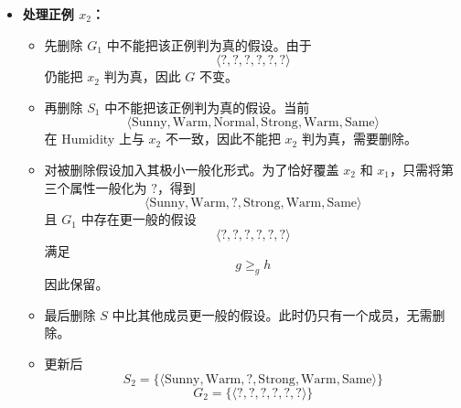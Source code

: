 \documentclass[../main.tex]{subfiles}
\begin{document}
\begin{enumerate}
{\begin{itemize}
        \item \textbf{处理正例 $x_2$：}
        \begin{itemize}
            \item 先删除 $G_1$ 中不能把该正例判为真的假设。由于
            \[
                \langle ?, ?, ?, ?, ?, ? \rangle
            \]
            仍能把 $x_2$ 判为真，因此 $G$ 不变。
            \item 再删除 $S_1$ 中不能把该正例判为真的假设。当前
            \[
                \langle \text{Sunny}, \text{Warm}, \text{Normal}, \text{Strong}, \text{Warm}, \text{Same} \rangle
            \]
            在 Humidity 上与 $x_2$ 不一致，因此不能把 $x_2$ 判为真，需要删除。
            \item 对被删除假设加入其极小一般化形式。为了恰好覆盖 $x_2$ 和 $x_1$，只需将第三个属性一般化为 $?$，得到
            \[
                \langle \text{Sunny}, \text{Warm}, ?, \text{Strong}, \text{Warm}, \text{Same} \rangle
            \]
            且 $G_1$ 中存在更一般的假设
            \[
                \langle ?, ?, ?, ?, ?, ? \rangle
            \]
            满足
            \[
                g \geq_g h
            \]
            因此保留。
            \item 最后删除 $S$ 中比其他成员更一般的假设。此时仍只有一个成员，无需删除。
            \item 更新后
            \[
                S_2=\{\langle \text{Sunny}, \text{Warm}, ?, \text{Strong}, \text{Warm}, \text{Same} \rangle\}
            \]
            \[
                G_2=\{\langle ?, ?, ?, ?, ?, ? \rangle\}
            \]
        \end{itemize}


\end{itemize}}
\end{enumerate}
\end{document}
